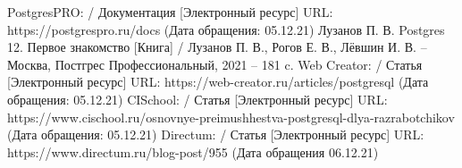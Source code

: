 
\begin{thebibliography}{7}
     PostgresPRO: / Документация [Электронный ресурс] URL: https://postgrespro.ru/docs (Дата обращения: 05.12.21)
     Лузанов П. В. Postgres 12. Первое знакомство [Книга] / Лузанов П. В., Рогов Е. В., Лёвшин И. В. -- Москва, Постгрес Профессиональный, 2021 -- 181 c.
     Web Creator: / Статья [Электронный ресурс] URL: https://web-creator.ru/articles/postgresql (Дата обращения: 05.12.21)
     CISchool: / Статья [Электронный ресурс] URL: https://www.cischool.ru/osnovnye-preimushhestva-postgresql-dlya-razrabotchikov (Дата обращения: 05.12.21)
     Directum: / Статья [Электронный ресурс] URL: https://www.directum.ru/blog-post/955 (Дата обращения 06.12.21)
\end{thebibliography}

\newpage
